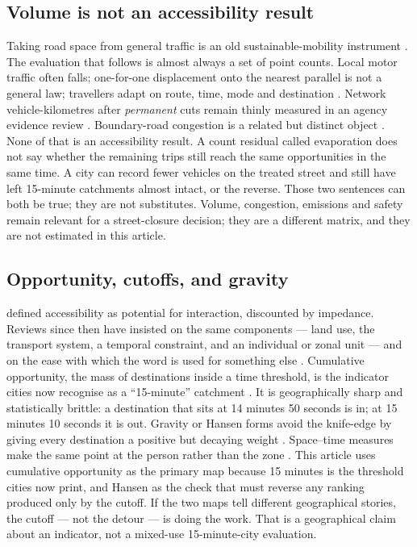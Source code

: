 \documentclass[a4paper,fleqn]{cas-dc}
\begin{document}
\subsection{Volume is not an accessibility result}

Taking road space from general traffic is an old sustainable-mobility
instrument \citep{Banister2008,Bertolini2005}. The evaluation that follows
is almost always a set of point counts. Local motor traffic often falls;
one-for-one displacement onto the nearest parallel is not a general law;
travellers adapt on route, time, mode and destination
\citep{Cairns1998,Cairns2002,NelloDeakin2022,Thomas2024,Tennoy2021,Parady2025}.
Network vehicle-kilometres after \emph{permanent} cuts remain thinly measured
in an agency evidence review \citep{Koorey2025}. Boundary-road congestion is
a related but distinct
object \citep{Verlinghieri2025}. None of that is an accessibility result. A
count residual called evaporation does not say whether the remaining trips
still reach the same opportunities in the same time. A city can record fewer
vehicles on the treated street and still have left 15-minute catchments
almost intact, or the reverse. Those two sentences can both be true; they
are not substitutes. Volume, congestion, emissions and safety remain
relevant for a street-closure decision; they are a different matrix, and
they are not estimated in this article.

\subsection{Opportunity, cutoffs, and gravity}

\citet{Hansen1959} defined accessibility as potential for interaction,
discounted by impedance. Reviews since then have insisted on the same
components --- land use, the transport system, a temporal constraint, and an
individual or zonal unit --- and on the ease with which the word is used for
something else \citep{Geurs2004,Paez2012,Handy2020,Wu2020}. Cumulative
opportunity, the mass of destinations inside a time threshold, is the
indicator cities now recognise as a ``15-minute'' catchment
\citep{Moreno2021}. It is geographically sharp and statistically brittle: a
destination that sits at 14 minutes 50 seconds is in; at 15 minutes 10
seconds it is out. Gravity or Hansen forms avoid the knife-edge by giving
every destination a positive but decaying weight
\citep{Geurs2004,Paez2012}. Space--time measures make the same point at the
person rather than the zone \citep{Kwan1998,Miller1999}. This article uses
cumulative opportunity as the primary map because 15 minutes is the
threshold cities now print, and Hansen as the check that must reverse any
ranking produced only by the cutoff. If the two maps tell different geographical
stories, the cutoff --- not the detour --- is doing the work. That is a
geographical claim about an indicator, not a mixed-use 15-minute-city
evaluation.
\end{document}
